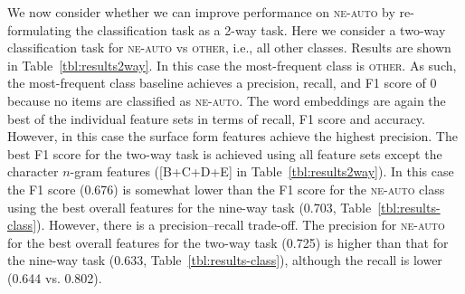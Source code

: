 \documentclass[10pt, a4paper]{article}
\newcommand{\tabref}[2][]{Table#1~\ref{#2}\xspace}
\begin{document}
We now consider whether we can improve performance on \textsc{ne-auto}
by re-formulating the classification task as a 2-way task. Here we
consider a two-way classification task for \textsc{ne-auto} vs
\textsc{other}, i.e., all other classes. Results are shown in
\tabref{tbl:results2way}. In this case the most-frequent class is
\textsc{other}. As such, the most-frequent class baseline achieves a
precision, recall, and F1 score of 0 because no items are classified
as \textsc{ne-auto}. The word embeddings are again the best of the
individual feature sets in terms of recall, F1 score and
accuracy. However, in this case the surface form features achieve the
highest precision. The best F1 score for the two-way task is achieved
using all feature sets except the character $n$-gram features
([B+C+D+E] in \tabref{tbl:results2way}). In this case the F1 score
(0.676) is somewhat lower than the F1 score for the \textsc{ne-auto}
class using the best overall features for the nine-way task (0.703,
\tabref{tbl:results-class}). However, there is a precision--recall
trade-off. The precision for \textsc{ne-auto} for the best overall
features for the two-way task (0.725) is higher than that for the
nine-way task (0.633, \tabref{tbl:results-class}), although the recall
is lower (0.644 vs. 0.802).
\end{document}
